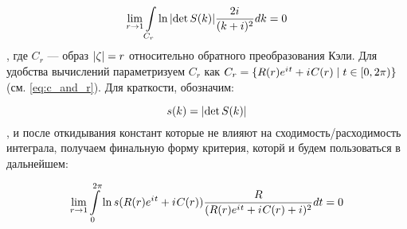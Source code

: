 \begin{equation}\label{eq:crit}
\lim\limits_{r \to 1} \int\limits_{C_r} \ln \abs{\det S(k)} \frac{2 {i\mkern1mu}}{(k + i)^2} dk = 0
\end{equation}
, где $C_r$ — образ $\abs{\zeta} = r$ относительно обратного преобразования Кэли. Для удобства вычислений параметризуем $C_r$ как $C_r = \{R(r) e^{{i\mkern1mu} t} + {i\mkern1mu} C(r) \mid t \in [0, 2 \pi)\}$ (см. \ref{eq:c_and_r}). Для краткости, обозначим:

\[
s(k) = \abs{\det S(k)}
\]
, и после откидывания констант которые не влияют на сходимость/расходимость интеграла, получаем финальную форму критерия, которй и будем пользоваться в дальнейшем:

\begin{equation}\label{eq:critp}
\lim\limits_{r \to 1} \int\limits_{0}^{2 \pi} \ln s(R(r) e^{{i\mkern1mu} t} + {i\mkern1mu} C(r)) \frac{R}{(R(r) e^{{i\mkern1mu} t} + {i\mkern1mu} C(r) + i)^2} dt = 0
\end{equation}

